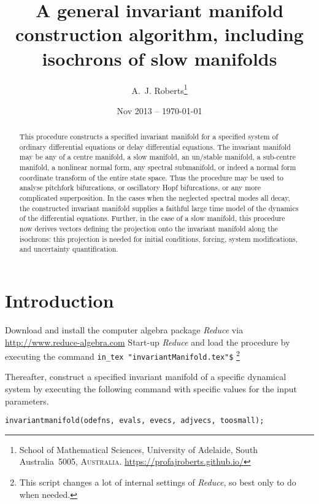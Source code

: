 \documentclass[11pt,a5paper]{article}
\title{A general invariant manifold construction algorithm,
including isochrons of slow manifolds}
\author{A.~J. Roberts\thanks{School of Mathematical
Sciences, University of Adelaide, South Australia~5005,
\textsc{Australia}. \url{https://profajroberts.github.io/}}}
\date{Nov 2013 -- \today}
\begin{document}
\maketitle

\begin{abstract}
This procedure constructs a specified invariant manifold for
a specified system of ordinary differential equations or
delay differential equations. The invariant manifold may be
any of a centre manifold, a slow manifold, an un/stable
manifold, a sub-centre manifold, a nonlinear normal form,
any spectral submanifold, or indeed a normal form coordinate
transform of the entire state space. Thus the procedure may
be used to analyse pitchfork bifurcations, or oscillatory
Hopf bifurcations, or any more complicated superposition. In
the cases when the neglected spectral modes all decay, the
constructed invariant manifold supplies a faithful large
time model of the dynamics of the differential equations.
Further, in the case of a slow manifold, this procedure now
derives vectors defining the projection onto the invariant
manifold along the isochrons: this projection is needed for
initial conditions, forcing, system modifications, and
uncertainty quantification.
\end{abstract}

\tableofcontents



\section{Introduction}

Download and install the computer algebra package
\emph{Reduce} via \url{http://www.reduce-algebra.com}\quad
Start-up \emph{Reduce} and load the procedure by executing
the command \verb|in_tex "invariantManifold.tex"$|
\footnote{This script changes a lot of internal settings of
\emph{Reduce}, so best only to do when needed.}

Thereafter, construct a specified invariant manifold of a
specific dynamical system by executing the following command
with specific values for the input parameters.
\begin{verbatim}
invariantmanifold(odefns, evals, evecs, adjvecs, toosmall);
\end{verbatim}
\end{document}
